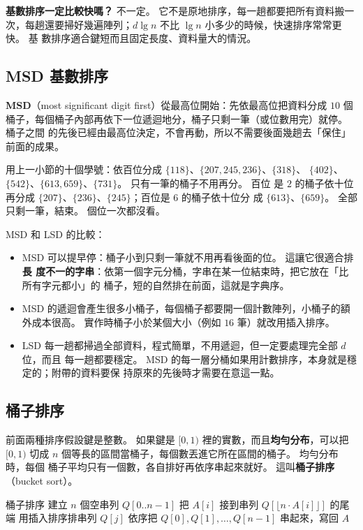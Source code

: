 \textbf{基數排序一定比較快嗎？} 不一定。 它不是原地排序，每一趟都要把所有資料搬一
次，每趟還要掃好幾遍陣列；$d \lg n$ 不比 $\lg n$ 小多少的時候，快速排序常常更快。 基
數排序適合鍵短而且固定長度、資料量大的情況。

\subsection{MSD 基數排序}
\label{sec:lin-msd}

\textbf{MSD}（most significant digit first）從最高位開始：先依最高位把資料分成 $10$
個桶子，每個桶子內部再依下一位遞迴地分，桶子只剩一筆（或位數用完）就停。 桶子之間
的先後已經由最高位決定，不會再動，所以不需要後面幾趟去「保住」前面的成果。

用上一小節的十個學號：依百位分成 $\{118\}$、$\{207, 245, 236\}$、$\{318\}$、
$\{402\}$、$\{542\}$、$\{613, 659\}$、$\{731\}$。 只有一筆的桶子不用再分。 百位
是 $2$ 的桶子依十位再分成 $\{207\}$、$\{236\}$、$\{245\}$；百位是 $6$ 的桶子依十位分
成 $\{613\}$、$\{659\}$。 全部只剩一筆，結束。 個位一次都沒看。

MSD 和 LSD 的比較：

\begin{itemize}
\item MSD 可以提早停：桶子小到只剩一筆就不用再看後面的位。 這讓它很適合排\textbf{長
度不一的字串}：依第一個字元分桶，字串在某一位結束時，把它放在「比所有字元都小」的
桶子，短的自然排在前面，這就是字典序。
\item MSD 的遞迴會產生很多小桶子，每個桶子都要開一個計數陣列，小桶子的額外成本很高。
實作時桶子小於某個大小（例如 $16$ 筆）就改用插入排序。
\item LSD 每一趟都掃過全部資料，程式簡單，不用遞迴，但一定要處理完全部 $d$ 位，而且
每一趟都要穩定。 MSD 的每一層分桶如果用計數排序，本身就是穩定的；附帶的資料要保
持原來的先後時才需要在意這一點。
\end{itemize}

\subsection{桶子排序}
\label{sec:lin-bucket}

前面兩種排序假設鍵是整數。 如果鍵是 $[0, 1)$ 裡的實數，而且\textbf{均勻分布}，可以把
$[0, 1)$ 切成 $n$ 個等長的區間當桶子，每個數丟進它所在區間的桶子。 均勻分布時，每個
桶子平均只有一個數，各自排好再依序串起來就好。 這叫\textbf{桶子排序}（bucket
sort）。

\begin{pseudo}[label=alg:lin-bucket]{桶子排序}
    \State 建立 $n$ 個空串列 $Q[0..n-1]$
        \State 把 $A[i]$ 接到串列 $Q[\lfloor n \cdot A[i] \rfloor]$ 的尾端
    \EndFor
        \State 用插入排序排串列 $Q[j]$
    \EndFor
    \State 依序把 $Q[0], Q[1], \ldots, Q[n-1]$ 串起來，寫回 $A$
\EndProcedure
\end{pseudo}

